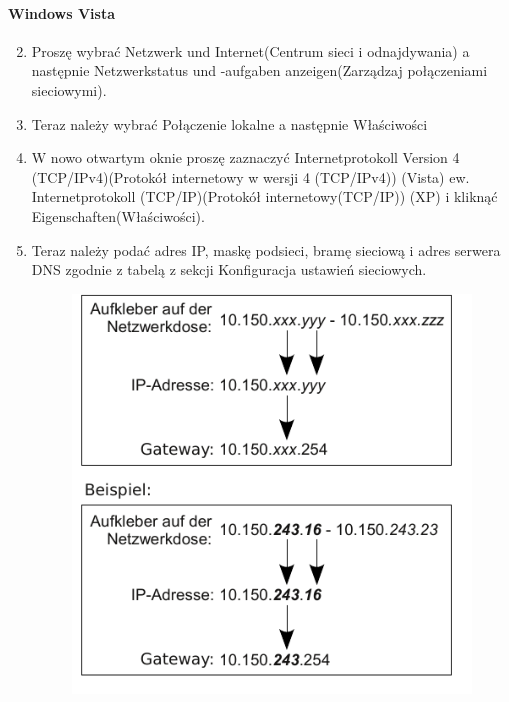 \documentclass[a4paper,12pt]{scrartcl}
\begin{document}
\paragraph*{Windows Vista}
\begin{enumerate}
    \setcounter{enumi}{1}
    \item Proszę wybrać Netzwerk und Internet(Centrum sieci i odnajdywania) a następnie Netzwerkstatus und -aufgaben anzeigen(Zarządzaj połączeniami sieciowymi).
    \item Teraz należy wybrać Połączenie lokalne a następnie Właściwości
    \setcounter{enumi}{4}
    \item W nowo otwartym oknie proszę zaznaczyć Internetprotokoll Version 4 (TCP/IPv4)(Protokół internetowy w wersji 4 (TCP/IPv4)) (Vista) ew. Internetprotokoll  (TCP/IP)(Protokół internetowy(TCP/IP)) (XP) i kliknąć Eigenschaften(Właściwości).
    \item Teraz należy podać adres IP, maskę podsieci, bramę sieciową i adres serwera DNS zgodnie z tabelą z sekcji Konfiguracja ustawień sieciowych.
      \begin{figure}[h!]
	\centering
        \vspace{-5pt}
        \begin{minipage}[c]{0.45\linewidth}
          \centering
          \includegraphics[width=\linewidth,keepaspectratio]{Bilder/IP_Gerneric}

\end{minipage}
\end{figure}
\end{enumerate}
\end{document}
